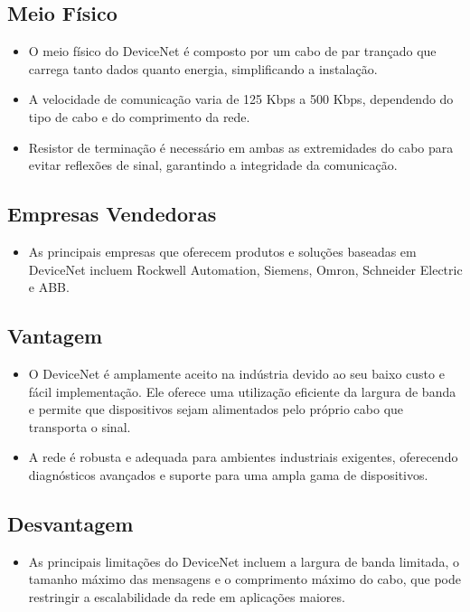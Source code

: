 \documentclass[a4paper,11pt]{article} %
\begin{document}
\subsection{Meio Físico}
\begin{itemize}
    \item O meio físico do DeviceNet é composto por um cabo de par trançado que carrega tanto dados quanto energia, simplificando a instalação.
    \item A velocidade de comunicação varia de 125 Kbps a 500 Kbps, dependendo do tipo de cabo e do comprimento da rede.
    \item Resistor de terminação é necessário em ambas as extremidades do cabo para evitar reflexões de sinal, garantindo a integridade da comunicação.
\end{itemize}

\subsection{Empresas Vendedoras}
\begin{itemize}
    \item As principais empresas que oferecem produtos e soluções baseadas em DeviceNet incluem Rockwell Automation, Siemens, Omron, Schneider Electric e ABB.
\end{itemize}

\subsection{Vantagem}
\begin{itemize}
    \item O DeviceNet é amplamente aceito na indústria devido ao seu baixo custo e fácil implementação. Ele oferece uma utilização eficiente da largura de banda e permite que dispositivos sejam alimentados pelo próprio cabo que transporta o sinal.
    \item A rede é robusta e adequada para ambientes industriais exigentes, oferecendo diagnósticos avançados e suporte para uma ampla gama de dispositivos.
\end{itemize}

\subsection{Desvantagem}
\begin{itemize}
    \item As principais limitações do DeviceNet incluem a largura de banda limitada, o tamanho máximo das mensagens e o comprimento máximo do cabo, que pode restringir a escalabilidade da rede em aplicações maiores.
\end{itemize}
\end{document}
